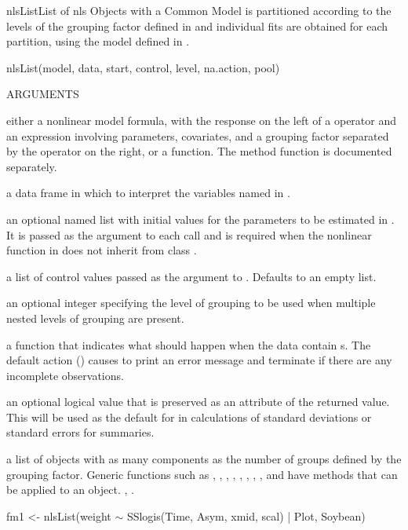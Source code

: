 \documentclass[pdftex]{article} \usepackage{url,graphicx}
\renewcommand{\Twiddle}{\mbox{\(\sim\)}}
\begin{document}
\begin{Helpfile}{nlsList}{List of nls Objects with a Common Model}
 is partitioned according to the levels of the grouping
factor defined in  and individual  fits are
obtained for each  partition, using the model defined in
.
\begin{Example}
nlsList(model, data, start, control, level, na.action, pool)
\end{Example}
\begin{Argument}{ARGUMENTS}
\item[\Co{model:}]
either a nonlinear model formula, with the response on
the left of a \Co{{\Twiddle}} operator and an expression involving
parameters, covariates, and a grouping factor separated by the
\Co{|} operator on the right, or a  function.  The
method function  is documented separately.
\item[\Co{data:}]
a data frame in which to interpret the variables named in
.
\item[\Co{start:}]
an optional named list with initial values for the
parameters to be estimated in . It is passed as the
 argument to each  call and is required when
the nonlinear function in  does not inherit from class
.
\item[\Co{control:}]
a list of control values passed as the 
argument to . Defaults to an empty list.
\item[\Co{level:}]
an optional integer specifying the level of grouping to be used when 
multiple nested levels of grouping are present.
\item[\Co{na.action:}]
a function that indicates what should happen when the
data contain s.  The default action () causes
 to print an error message and terminate if there are any
incomplete observations.
\item[\Co{pool:}]
an optional logical value that is preserved as an attribute of the
returned value.  This will be used as the default for  in
calculations of standard deviations or standard errors for summaries.
\end{Argument}
a list of  objects with as many components as the number of
groups defined by the grouping factor. Generic functions such as
, , , ,
, , , ,
and  have methods that can be applied to an 
object.
, .
\need 15pt
\vspace{-16pt}
\begin{Example}
fm1 <- nlsList(weight {\Twiddle} SSlogis(Time, Asym, xmid, scal) | Plot, 
               Soybean)
\end{Example}
\end{Helpfile}
\end{document}
